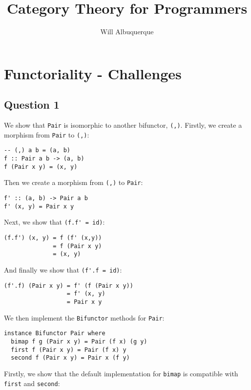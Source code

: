 \documentclass{article}
\title{Category Theory for Programmers}
\author{Will Albuquerque}
\date{}
\begin{document}
\lstset{language=Haskell}

\maketitle

\section{Functoriality - Challenges}

\subsection{Question 1}

We show that \lstinline{Pair} is isomorphic to another bifunctor,
\lstinline{(,)}. Firstly, we create a morphism from \lstinline{Pair} to
\lstinline{(,)}:

\begin{lstlisting}
-- (,) a b = (a, b)
f :: Pair a b -> (a, b)
f (Pair x y) = (x, y)
\end{lstlisting}

Then we create a morphism from \lstinline{(,)} to \lstinline{Pair}:

\begin{lstlisting}
f' :: (a, b) -> Pair a b
f' (x, y) = Pair x y
\end{lstlisting}

Next, we show that \lstinline{(f.f' = id)}:

\begin{lstlisting}
(f.f') (x, y) = f (f' (x,y))
              = f (Pair x y)
              = (x, y)
\end{lstlisting}

And finally we show that \lstinline{(f'.f = id)}:

\begin{lstlisting}
(f'.f) (Pair x y) = f' (f (Pair x y))
                  = f' (x, y)
                  = Pair x y
\end{lstlisting}

We then implement the \lstinline{Bifunctor} methods for \lstinline{Pair}:

\begin{lstlisting}
instance Bifunctor Pair where
  bimap f g (Pair x y) = Pair (f x) (g y)
  first f (Pair x y) = Pair (f x) y
  second f (Pair x y) = Pair x (f y)
\end{lstlisting}

Firstly, we show that the default implementation for \lstinline{bimap} is
compatible with \lstinline{first} and \lstinline{second}:
\end{document}
